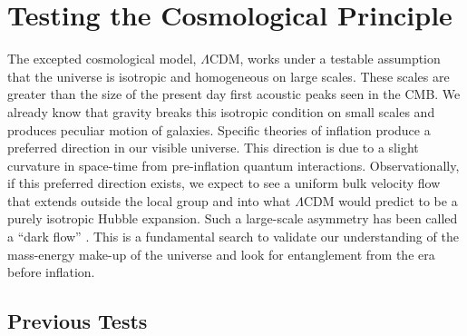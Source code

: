 \documentclass[apj, iop]{emulateapj}
\begin{document}
\section{Testing the Cosmological Principle}\label{testing-the-cosmological-principle}

The excepted cosmological model, $\Lambda$CDM, works under a testable assumption
that the universe is isotropic and homogeneous on large scales. These scales are
greater than the size of the present day first acoustic peaks seen in the CMB.
We already know that gravity breaks this isotropic condition on small scales and
produces peculiar motion of galaxies. Specific theories of inflation
\citep[like in][]{MersiniHoughton:2008io} produce a preferred direction in our visible
universe. This direction is due to a slight curvature in space-time from pre-inflation
quantum interactions. Observationally, if this preferred direction exists, we expect to
see a uniform bulk velocity flow that extends outside the local group and into
what $\Lambda$CDM would predict to be a purely isotropic Hubble expansion. Such
a large-scale asymmetry has been called a ``dark flow''
\citep{MersiniHoughton:2008io}. This is a fundamental search to validate our
understanding of the mass-energy make-up of the universe and look for
entanglement from the era before inflation.

\subsection{Previous Tests}\label{previous-tests}
\end{document}
